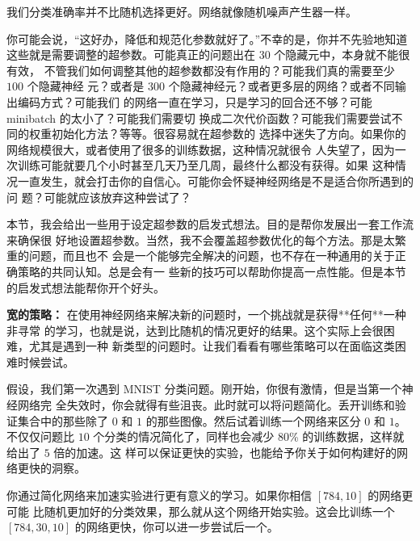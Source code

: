 我们分类准确率并不比随机选择更好。网络就像随机噪声产生器一样。

你可能会说，“这好办，降低\learningrate{}和规范化参数就好了。”不幸的是，你并不先验地知道
这些就是需要调整的超参数。可能真正的问题出在 $30$ 个隐藏元中，本身就不能很有效，
不管我们如何调整其他的超参数都没有作用的？可能我们真的需要至少 $100$ 个隐藏神经
元？或者是 $300$ 个隐藏神经元？或者更多层的网络？或者不同输出编码方式？可能我们
的网络一直在学习，只是学习的回合还不够？可能 minibatch 的太小了？可能我们需要切
换成二次代价函数？可能我们需要尝试不同的权重初始化方法？等等。很容易就在超参数的
选择中迷失了方向。如果你的网络规模很大，或者使用了很多的训练数据，这种情况就很令
人失望了，因为一次训练可能就要几个小时甚至几天乃至几周，最终什么都没有获得。如果
这种情况一直发生，就会打击你的自信心。可能你会怀疑神经网络是不是适合你所遇到的问
题？可能就应该放弃这种尝试了？

本节，我会给出一些用于设定超参数的启发式想法。目的是帮你发展出一套工作流来确保很
好地设置超参数。当然，我不会覆盖超参数优化的每个方法。那是太繁重的问题，而且也不
会是一个能够完全解决的问题，也不存在一种通用的关于正确策略的共同认知。总是会有一
些新的技巧可以帮助你提高一点性能。但是本节的启发式想法能帮你开个好头。

\textbf{宽的策略：} 在使用神经网络来解决新的问题时，一个挑战就是获得**任何**一种非寻常
的学习，也就是说，达到比随机的情况更好的结果。这个实际上会很困难，尤其是遇到一种
新类型的问题时。让我们看看有哪些策略可以在面临这类困难时候尝试。

假设，我们第一次遇到 MNIST 分类问题。刚开始，你很有激情，但是当第一个神经网络完
全失效时，你会就得有些沮丧。此时就可以将问题简化。丢开训练和验证集合中的那些除了
$0$ 和 $1$ 的那些图像。然后试着训练一个网络来区分 $0$ 和 $1$。不仅仅问题比 $10$
个分类的情况简化了，同样也会减少 80\% 的训练数据，这样就给出了 $5$ 倍的加速。这
样可以保证更快的实验，也能给予你关于如何构建好的网络更快的洞察。

你通过简化网络来加速实验进行更有意义的学习。如果你相信 $[784, 10]$ 的网络更可能
比随机更加好的分类效果，那么就从这个网络开始实验。这会比训练一个 $[784, 30 ,10]$
的网络更快，你可以进一步尝试后一个。

